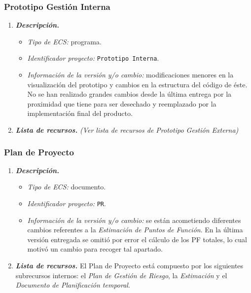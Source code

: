 \documentclass[11pt, a4paper, twoside, titlepage]{article}
\begin{document}
			\subsubsection{Prototipo Gestión Interna}
			\begin{enumerate}
				\item {\itshape \bfseries Descripción.}
						\begin{itemize}
							\item \textit{Tipo de ECS:} programa.
							\item \textit{Identificador proyecto:} \verb|Prototipo Interna|.
							\item \textit{Información de la versión y/o cambio:} modificaciones menores en la visualización del prototipo y cambios en la estructura del código de éste. No se han realizado grandes cambios desde la última entrega por la proximidad que tiene para ser desechado y reemplazado por la implementación final del producto.
						\end{itemize}

					\item {\itshape \bfseries Lista de recursos.}
						\textit{(Ver lista de recursos de Prototipo Gestión Externa)}
				\end{enumerate}

			\subsubsection{Plan de Proyecto}
			\begin{enumerate}
				\item {\itshape \bfseries Descripción.}
						\begin{itemize}
							\item \textit{Tipo de ECS:} documento.
							\item \textit{Identificador proyecto:} \verb|PR|.
							\item \textit{Información de la versión y/o cambio:} se están acometiendo diferentes cambios referentes a la \textit{Estimación de Puntos de Función}. En la última versión entregada se omitió por error el cálculo de los PF totales, lo cual motivó un cambio para recoger tal apartado.
						\end{itemize}

					\item {\itshape \bfseries Lista de recursos.}
						El Plan de Proyecto está compuesto por los siguientes subrecursos internos: el \textit{Plan de Gestión de Riesgo}, la \textit{Estimación} y el \textit{Documento de Planificación temporal}.
				\end{enumerate}
\end{document}
